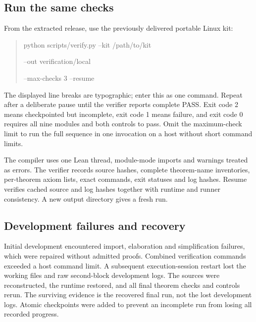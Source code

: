 \documentclass[11pt,letterpaper]{article}
\begin{document}
\subsection*{Run the same checks}
From the extracted release, use the previously delivered portable Linux kit:
\begin{quote}\small\ttfamily
python scripts/verify.py --kit /path/to/kit\par
\hspace*{1em}--out verification/local\par
\hspace*{1em}--max-checks 3 --resume
\end{quote}
The displayed line breaks are typographic; enter this as one command. Repeat after a deliberate pause until the verifier reports complete PASS. Exit code 2 means checkpointed but incomplete, exit code 1 means failure, and exit code 0 requires all nine modules and both controls to pass. Omit the maximum-check limit to run the full sequence in one invocation on a host without short command limits.

The compiler uses one Lean thread, module-mode imports and warnings treated as errors. The verifier records source hashes, complete theorem-name inventories, per-theorem axiom lists, exact commands, exit statuses and log hashes. Resume verifies cached source and log hashes together with runtime and runner consistency. A new output directory gives a fresh run.

\subsection*{Development failures and recovery}
Initial development encountered import, elaboration and simplification failures, which were repaired without admitted proofs. Combined verification commands exceeded a host command limit. A subsequent execution-session restart lost the working files and raw second-block development logs. The sources were reconstructed, the runtime restored, and all final theorem checks and controls rerun. The surviving evidence is the recovered final run, not the lost development logs. Atomic checkpoints were added to prevent an incomplete run from losing all recorded progress.
\end{document}
